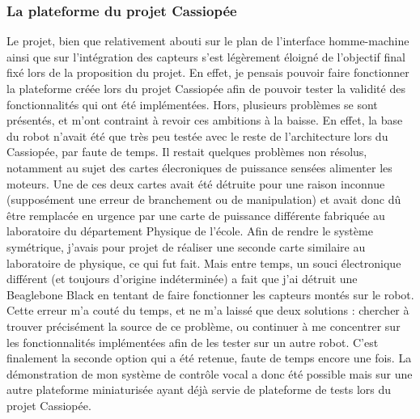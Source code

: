 \documentclass{report}
\begin{document}
\subsubsection{La plateforme du projet Cassiopée}
{Le projet, bien que relativement abouti sur le plan de l'interface homme-machine
ainsi que sur l'intégration des capteurs s'est légèrement éloigné de l'objectif final
fixé lors de la proposition du projet. En effet, je pensais pouvoir faire fonctionner
la plateforme créée lors du projet Cassiopée afin de pouvoir tester la validité
des fonctionnalités qui ont été implémentées. Hors, plusieurs problèmes se sont présentés,
et m'ont contraint à revoir ces ambitions à la baisse. En effet, la base du robot
n'avait été que très peu testée avec le reste de l'architecture lors du Cassiopée,
par faute de temps. Il restait quelques problèmes non résolus, notamment au sujet
des cartes élecroniques de puissance sensées alimenter les moteurs. Une de ces
deux cartes avait été détruite pour une raison inconnue (supposément une erreur
de branchement ou de manipulation) et avait donc dû être remplacée en urgence
par une carte de puissance différente fabriquée au laboratoire du département
Physique de l'école. Afin de rendre le système symétrique, j'avais
pour projet de réaliser une seconde carte similaire au laboratoire de physique,
ce qui fut fait. Mais entre temps, un souci électronique différent (et toujours
d'origine indéterminée) a fait que j'ai détruit une Beaglebone Black en tentant
de faire fonctionner les capteurs montés sur le robot. Cette erreur m'a couté
du temps, et ne m'a laissé que deux solutions : chercher à trouver précisément la
source de ce problème, ou continuer à me concentrer sur les fonctionnalités
implémentées afin de les tester sur un autre robot. C'est finalement la seconde option
qui a été retenue, faute de temps encore une fois. La démonstration de mon système
de contrôle vocal a donc été possible mais sur une autre plateforme miniaturisée
ayant déjà servie de plateforme de tests lors du projet Cassiopée.}
\end{document}
